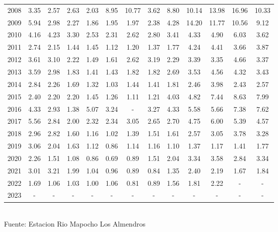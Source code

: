 \documentclass{article} %
\begin{document}
\begin{table}[H]
{\begin{tabular}{|c|c|c|c|c|c|c|c|c|c|c|c|c|}
        2008 & 3.35 & 2.57 & 2.63 & 2.03 & 8.95 & 10.77 & 3.62 & 8.80 & 10.14 & 13.98 & 16.96 & 10.33 \\
        2009 & 5.94 & 2.98 & 2.27 & 1.86 & 1.95 & 1.97 & 2.38 & 4.28 & 14.20 & 11.77 & 10.56 & 9.12 \\
        2010 & 4.16 & 4.23 & 3.30 & 2.53 & 2.31 & 2.62 & 2.80 & 3.41 & 4.33 & 4.90 & 6.03 & 3.62 \\
        2011 & 2.74 & 2.15 & 1.44 & 1.45 & 1.12 & 1.20 & 1.37 & 1.77 & 4.24 & 4.41 & 3.66 & 3.87 \\
        2012 & 3.61 & 3.10 & 2.22 & 1.49 & 1.61 & 2.62 & 3.19 & 2.29 & 3.39 & 3.35 & 4.66 & 3.37 \\
        2013 & 3.59 & 2.98 & 1.83 & 1.41 & 1.43 & 1.82 & 1.82 & 2.69 & 3.53 & 4.56 & 4.32 & 3.43 \\
        2014 & 2.84 & 2.26 & 1.69 & 1.32 & 1.03 & 1.44 & 1.41 & 1.81 & 2.46 & 3.98 & 2.43 & 2.57 \\
        2015 & 2.40 & 2.20 & 2.20 & 1.45 & 1.26 & 1.11 & 1.21 & 4.03 & 4.82 & 7.44 & 8.63 & 7.99 \\
        2016 & 4.33 & 2.93 & 1.38 & 5.07 & 3.24 & - & 3.27 & 4.33 & 5.58 & 5.66 & 7.38 & 7.62 \\
        2017 & 5.56 & 2.84 & 2.00 & 2.32 & 2.34 & 3.05 & 2.65 & 2.70 & 4.75 & 6.00 & 5.39 & 4.57 \\
        2018 & 2.96 & 2.82 & 1.60 & 1.16 & 1.02 & 1.39 & 1.51 & 1.61 & 2.57 & 3.05 & 3.78 & 3.28 \\
        2019 & 3.06 & 2.04 & 1.63 & 1.12 & 0.86 & 1.14 & 1.16 & 1.10 & 1.37 & 1.17 & 1.41 & 1.77 \\
        2020 & 2.26 & 1.51 & 1.08 & 0.86 & 0.69 & 0.89 & 1.51 & 2.04 & 3.34 & 3.58 & 2.84 & 3.34 \\
        2021 & 3.01 & 3.21 & 1.99 & 1.04 & 0.96 & 0.89 & 0.84 & 1.35 & 2.40 & 2.19 & 1.67 & 1.84 \\
        2022 & 1.69 & 1.06 & 1.03 & 1.00 & 1.06 & 0.81 & 0.89 & 1.56 & 1.81 & 2.22 & - & - \\
        2023 & - & - & - & - & - & - & - & - & - & - & - & - \\
        \hline
    \end{tabular}%
    }
    \label{tab:caudales_mensuales}
    \vspace{0.2cm}
    \\Fuente: Estacion Rio Mapocho Los Almendros
\end{table}

\newpage
\end{document}
